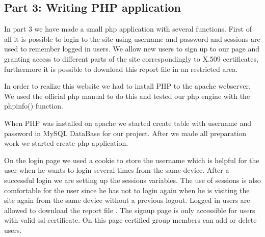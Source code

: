 \subsection {Part 3: Writing PHP application}


\noindent
In part 3 we have made a small php application with several functions. First of all it is possible to login to the site using username and password and sessions are used to remember logged in users. We allow new users to sign up to our page and granting access to different parts of the site correspondingly to X.509 certificates, furthermore it is possible to download this report file in an restricted area. \newline

\noindent
In order to realize this website we had to install PHP to the apache webserver. We used the official php manual to do this \cite{phpinstall}  and tested our php engine with the phpinfo() function.\newline

\noindent
When PHP was installed on apache we started  create table  with username and password  in MySQL DataBase for our project. After we made all preparation work we started create php application. 
\newline

\noindent
On the login page we used a cookie to store the username which is helpful for the user when he wants to login several times from the same device. After a successful login we are setting up the sessions variables. The use of sessions is also comfortable for the user since he has not to login again when he is visiting the site again from the same device without a previous logout. Logged in users  are allowed to download the report file . The signup page is only accessible for users with valid ssl certificate. On this page certified group members can add or delete users.
\newline
